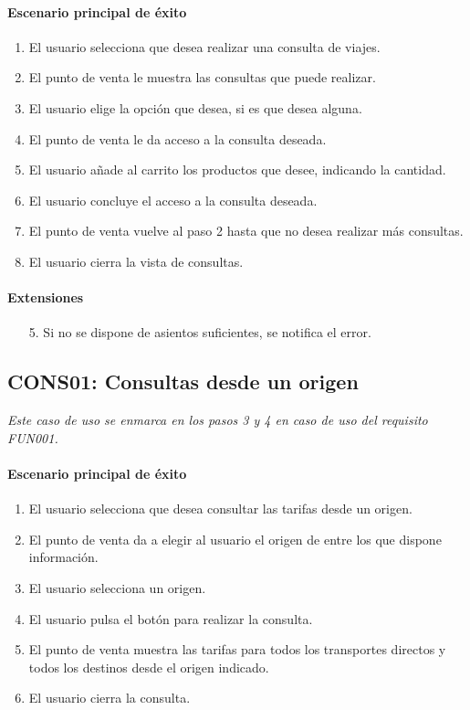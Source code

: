   \paragraph{Escenario principal de éxito}
  \begin{enumerate}
    \item El usuario selecciona que desea realizar una consulta de viajes.
    \item El punto de venta le muestra las consultas que puede realizar.
    \item El usuario elige la opción que desea, si es que desea alguna.
    \item El punto de venta le da acceso a la consulta deseada.
    \item El usuario añade al carrito los productos que desee, indicando la cantidad.
    \item El usuario concluye el acceso a la consulta deseada.
    \item El punto de venta vuelve al paso 2 hasta que no desea realizar más consultas.
    \item El usuario cierra la vista de consultas.
  \end{enumerate}
  \paragraph{Extensiones}
  \begin{enumerate}
    \item[5.] Si no se dispone de asientos suficientes, se notifica el error.
  \end{enumerate}

  \subsection{CONS01: Consultas desde un origen}
    \emph{Este caso de uso se enmarca en los pasos 3 y 4 en caso de uso del requisito FUN001.}
    \paragraph{Escenario principal de éxito}
    \begin{enumerate}
      \item El usuario selecciona que desea consultar las tarifas desde un origen.
      \item El punto de venta da a elegir al usuario el origen de entre los que dispone información.
      \item El usuario selecciona un origen.
      \item El usuario pulsa el botón para realizar la consulta.
      \item El punto de venta muestra las tarifas para todos los transportes directos y todos los destinos desde el origen indicado.
      \item El usuario cierra la consulta.
    \end{enumerate}


